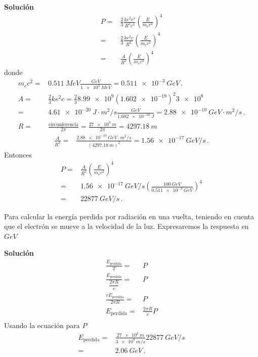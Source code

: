 \documentclass[11pt,a4paper]{book}
\begin{document}
\textbf{Solución}
\begin{align*}
    P =  &  \frac{2}{3} \frac{k e^2 c^4}{R^2c^3}\left(\frac{E}{m_ec^2}\right)^4\\
     =  &  \frac{2}{3} \frac{k e^2 c}{R^2}\left(\frac{E}{m_ec^2}\right)^4\\
    =& \frac{A}{R^2} \left(\frac{E}{m_ec^2}\right)^4
\end{align*}
donde
\begin{align}
    m_e c^2 =& \qty{0.511}{MeV}\frac{\unit{GeV}}{\qty{1e3}{MeV}} = \qty{0.511e-3}{GeV}\,.\\
    A =&\frac{2 }{3}  {k e^2 c}=\frac{2}{3}  {\num{8.99e9} (\num{1.602e-19})^2\num{3e8} }\nonumber\\
    =&\qty{4.61e-20}{J\cdot m^2/s}\frac{\unit{GeV}}{\qty{1.602e-10}{J}}=\qty{2.88e-10}{GeV\cdot m^2/s}\,.\\ 
    R =& \frac{\text{circunferencia}}{2\pi} = \frac{\qty{27e3}{m}}{2\pi} = \qty{4297.18}{m}\,
 \end{align}
\begin{align*}
    \frac{A}{R^2} =&\frac{\qty{2.88e-10}{GeV\cdot m^2/s}}{(\qty{4297.18}{m})^2}
     =\qty{1.56e-17}{GeV/s}\,.
\end{align*}
Entonces
\begin{align*}
    P =& \frac{A}{R^2}\left(\frac{E}{m_ec^2}\right)^4\\
    =& \qty{1.56e-17}{GeV/s}\left(\frac{\qty{100}{GeV}}{\qty{0.511e-3}{GeV}}\right)^4\\
    =& \qty{22877}{GeV/s}\,.
\end{align*}
    



Para calcular la energía perdida por radiación en una vuelta, teniendo en cuenta que el electrón se mueve a la velocidad de la luz. Expresaremos la respuesta en $\unit{GeV}$

\textbf{Solución}
\begin{align*}
    \frac{E_{\text{perdida}}}{T} =& P \\
    \frac{E_{\text{perdida}}}{\dfrac{2\pi R}{c}} = & P\\
    \frac{cE_{\text{perdida}}}{2\pi R} = & P\\
    E_{\text{perdida}}  = &\frac{2\pi R}{c} P\\
\end{align*}
Usando la ecuación para $P$
\begin{align*}
    E_{\text{perdida}}  = &\frac{\qty{27e3}{m}}{\qty{3e8}{m/s}}  \qty{22877}{GeV/s}\\
    =&\qty{2.06}{GeV}\,.
\end{align*}
\end{document}
